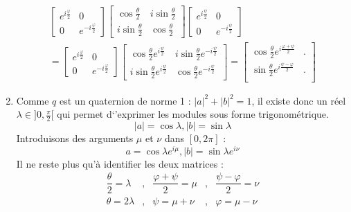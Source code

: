 \begin{enumerate}
\begin{multline*}
 \begin{bmatrix}
  e^{i\frac{\varphi}{2}} & 0\\
0 & e^{-i\frac{\varphi}{2}}
 \end{bmatrix}
\begin{bmatrix}
 \cos\frac{\theta}{2} & i\sin\frac{\theta}{2}  \\
i\sin\frac{\theta}{2} & \cos\frac{\theta}{2}
\end{bmatrix}
 \begin{bmatrix}
  e^{i\frac{\psi}{2}} & 0\\
0 & e^{-i\frac{\psi}{2}}
 \end{bmatrix}
\\
=  \begin{bmatrix}
  e^{i\frac{\varphi}{2}} & 0\\
0 & e^{-i\frac{\varphi}{2}}
 \end{bmatrix}
\begin{bmatrix}
 \cos\frac{\theta}{2}e^{i\frac{\psi}{2}} & i\sin\frac{\theta}{2}e^{-i\frac{\psi}{2}}  \\
i\sin\frac{\theta}{2}e^{i\frac{\psi}{2}} & \cos\frac{\theta}{2}e^{-i\frac{\psi}{2}}
\end{bmatrix} 
= 
\begin{bmatrix}
 \cos\frac{\theta}{2}e^{i\frac{\varphi+\psi}{2}} & . \\
 \sin\frac{\theta}{2}e^{i\frac{\psi - \varphi}{2}} & . \\
\end{bmatrix}
\end{multline*}
\item Comme $q$ est un quaternion de norme 1 : $|a|^2 + |b|^2=1$, il existe donc un réel $\lambda\in ]0,\frac{\pi}{2}[$ qui permet d`'exprimer les modules sous forme trigonométrique.
\begin{displaymath}
 |a| = \cos \lambda , |b| = \sin \lambda
\end{displaymath}
Introduisons des arguments $\mu$ et $\nu$ dans $[0,2\pi]$ :
\begin{displaymath}
 a = \cos \lambda e^{i\mu}, |b| = \sin \lambda e^{i\nu}
\end{displaymath}
Il ne reste plus qu'à identifier les deux matrices :
\begin{align*}
 \dfrac{\theta}{2}= \lambda &,& \dfrac{\varphi + \psi}{2}=\mu &,& \dfrac{\psi -\varphi}{2} =\nu \\
\theta = 2\lambda &,& \psi=\mu+\nu &,& \varphi = \mu - \nu
\end{align*}

\end{enumerate}